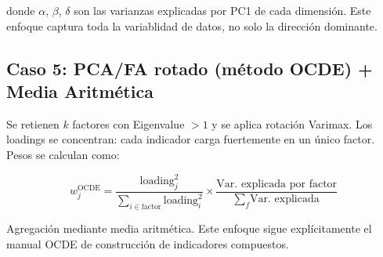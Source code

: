 donde $\alpha$, $\beta$, $\delta$ son las varianzas explicadas por PC1 de cada dimensión. Este enfoque captura toda la variablidad de datos, no solo la dirección dominante.

\subsection{Caso 5: PCA/FA rotado (método OCDE) + Media Aritmética}

Se retienen $k$ factores con Eigenvalue $> 1$ y se aplica rotación Varimax. Los loadings se concentran: cada indicador carga fuertemente en un único factor. Pesos se calculan como:

\begin{equation}
    w_j^{\text{OCDE}} = \frac{\text{loading}_j^2}{\sum_{i \in \text{factor}} \text{loading}_i^2} \times \frac{\text{Var. explicada por factor}}{\sum_f \text{Var. explicada}}
\end{equation}

Agregación mediante media aritmética. Este enfoque sigue explícitamente el manual OCDE de construcción de indicadores compuestos.


